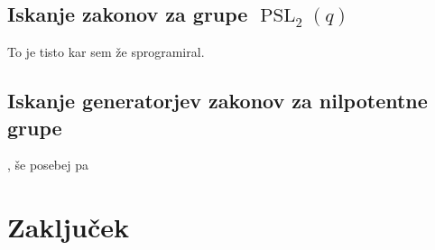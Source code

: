 \documentclass[mat1, tisk]{fmfdelo}
\begin{document}
\subsection{Iskanje zakonov za grupe $\operatorname{PSL}_2(q)$} %

To je tisto kar sem že sprogramiral.

\subsection{Iskanje generatorjev zakonov za nilpotentne grupe}

\cite{Cocke_2020}, še posebej pa \cite{Chilebus_Cocke_Ho_2024}

\section{Zaključek}


% 
\end{document}
